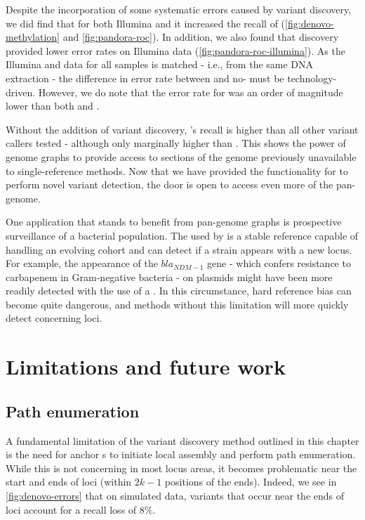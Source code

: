 Despite the incorporation of some \ont{} systematic errors caused by \denovo{} variant discovery, we did find that for both Illumina and \ont{} it increased the recall of \pandora{} (\autoref{fig:denovo-methylation} and \autoref{fig:pandora-roc}). In addition, we also found that \denovo{} discovery provided lower error rates on Illumina data (\autoref{fig:pandora-roc-illumina}). As the Illumina and \ont{} data for all samples is matched - i.e., from the same DNA extraction - the difference in error rate between \denovo{} and no-\denovo{} must be technology-driven. However, we do note that the \pandora{} error rate for \ont{} was an order of magnitude lower than both  and .

\noindent
Without the addition of \denovo{} variant discovery, \pandora{}'s recall is higher than all other variant callers tested - although only marginally higher than . This shows the power of genome graphs to provide access to sections of the genome previously unavailable to single-reference methods. Now that we have provided the functionality for \pandora{} to perform novel variant detection, the door is open to access even more of the pan-genome. 

One application that stands to benefit from pan-genome graphs is prospective surveillance of a bacterial population. The \panrg{} used by \pandora{} is a stable reference capable of handling an evolving cohort and can detect if a strain appears with a new locus. For example, the appearance of the $bla_{NDM-1}$ gene - which confers resistance to carbapenem in Gram-negative bacteria - on plasmids \cite{Yong2009,Kumarasamy2010} might have been more readily detected with the use of a \panrg{}. In this circumstance, hard reference bias can become quite dangerous, and methods without this limitation will more quickly detect concerning loci.

\section{Limitations and future work}
\label{sec:denovo-limits}

\subsection{Path enumeration}
\label{sec:fw-path-enum}

A fundamental limitation of the \denovo{} variant discovery method outlined in this chapter is the need for anchor \kmer{}s to initiate local assembly and perform path enumeration. While this is not concerning in most locus areas, it becomes problematic near the start and ends of loci (within $2k-1$ positions of the ends). Indeed, we see in \autoref{fig:denovo-errors} that on simulated data, variants that occur near the ends of loci account for a recall loss of 8\%.

